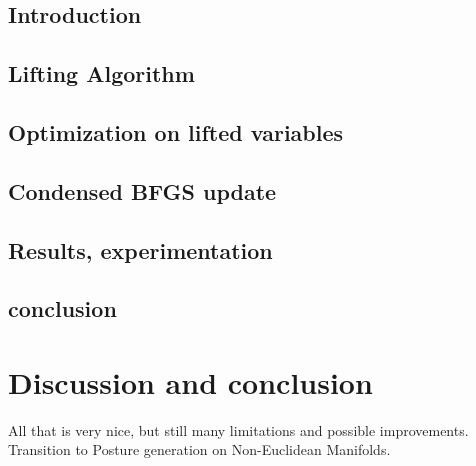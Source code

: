 \subsection{Introduction}
\label{subsec:Introduction}

\subsection{Lifting Algorithm}
\label{subsec:LiftingAlgorithm}

\subsection{Optimization on lifted variables}
\label{subsec:optimization_on_lifted_variables}

\subsection{Condensed BFGS update}
\label{subsec:condensed_bfgs_update}

\subsection{Results, experimentation}
\label{subsec:Results}

\subsection{conclusion}
\label{subsec:conclusion}



\section{Discussion and conclusion}


All that is very nice, but still many limitations and possible improvements.
Transition to Posture generation on Non-Euclidean Manifolds.



